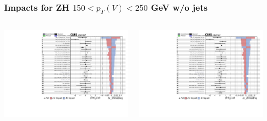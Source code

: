 \documentclass{beamer}
\begin{document}
\begin{frame}
  \frametitle{Impacts for ZH $150 < p_T(V) < 250$ GeV w/o jets}
  \centering
  \begin{columns}
    \begin{column}{0.5\linewidth}
      \includegraphics[width=0.85\linewidth,page=1]{figures/impacts/impacts_r_zhmednoj.pdf}
    \end{column}
    \begin{column}{0.5\linewidth}
      \includegraphics[width=0.85\linewidth,page=2]{figures/impacts/impacts_r_zhmednoj.pdf}
    \end{column}
  \end{columns}
\end{frame}
\end{document}
